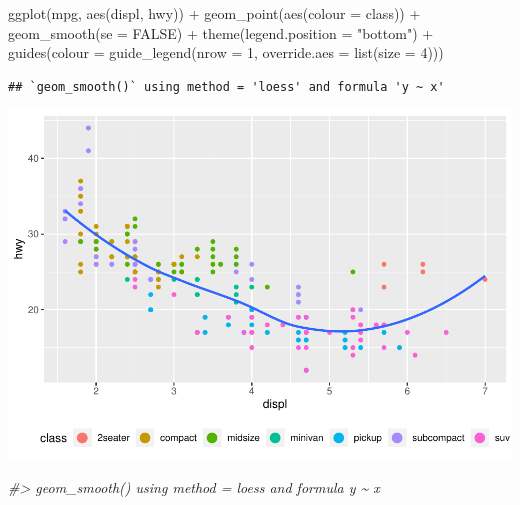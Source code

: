 \documentclass[
]{article}
\newenvironment{Shaded}{\begin{snugshade}}{\end{snugshade}}
\newcommand{\AttributeTok}[1]{\textcolor[rgb]{0.77,0.63,0.00}{#1}}
\newcommand{\CommentTok}[1]{\textcolor[rgb]{0.56,0.35,0.01}{\textit{#1}}}
\newcommand{\ConstantTok}[1]{\textcolor[rgb]{0.00,0.00,0.00}{#1}}
\newcommand{\DecValTok}[1]{\textcolor[rgb]{0.00,0.00,0.81}{#1}}
\newcommand{\FunctionTok}[1]{\textcolor[rgb]{0.00,0.00,0.00}{#1}}
\newcommand{\NormalTok}[1]{#1}
\newcommand{\SpecialCharTok}[1]{\textcolor[rgb]{0.00,0.00,0.00}{#1}}
\newcommand{\StringTok}[1]{\textcolor[rgb]{0.31,0.60,0.02}{#1}}
\begin{document}
\begin{Shaded}
\begin{Highlighting}[]
\FunctionTok{ggplot}\NormalTok{(mpg, }\FunctionTok{aes}\NormalTok{(displ, hwy)) }\SpecialCharTok{+}
  \FunctionTok{geom\_point}\NormalTok{(}\FunctionTok{aes}\NormalTok{(}\AttributeTok{colour =}\NormalTok{ class)) }\SpecialCharTok{+}
  \FunctionTok{geom\_smooth}\NormalTok{(}\AttributeTok{se =} \ConstantTok{FALSE}\NormalTok{) }\SpecialCharTok{+}
  \FunctionTok{theme}\NormalTok{(}\AttributeTok{legend.position =} \StringTok{"bottom"}\NormalTok{) }\SpecialCharTok{+}
  \FunctionTok{guides}\NormalTok{(}\AttributeTok{colour =} \FunctionTok{guide\_legend}\NormalTok{(}\AttributeTok{nrow =} \DecValTok{1}\NormalTok{, }\AttributeTok{override.aes =} \FunctionTok{list}\NormalTok{(}\AttributeTok{size =} \DecValTok{4}\NormalTok{)))}
\end{Highlighting}
\end{Shaded}

\begin{verbatim}
## `geom_smooth()` using method = 'loess' and formula 'y ~ x'
\end{verbatim}

\includegraphics{Assignments_files/figure-latex/unnamed-chunk-65-1.pdf}

\begin{Shaded}
\begin{Highlighting}[]
\CommentTok{\#\textgreater{} \textasciigrave{}geom\_smooth()\textasciigrave{} using method = \textquotesingle{}loess\textquotesingle{} and formula \textquotesingle{}y \textasciitilde{} x\textquotesingle{}}
\end{Highlighting}
\end{Shaded}
\end{document}
